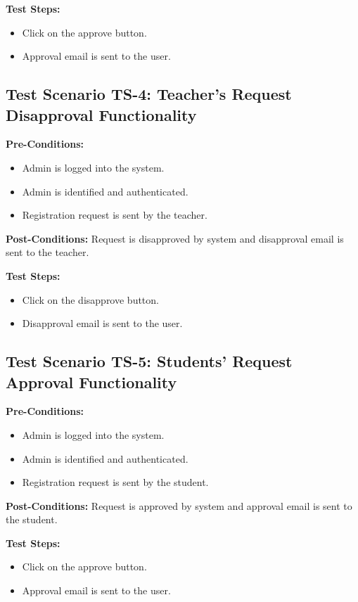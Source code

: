 \textbf{Test Steps:}
\begin{itemize}

\item Click on the approve button.
\item Approval email is sent to the user.

\end{itemize}


\subsection{Test Scenario TS-4: Teacher's Request Disapproval Functionality}
\textbf{Pre-Conditions: }
\begin{itemize}

\item Admin is logged into the system.
\item Admin is identified and authenticated.
\item Registration request is sent by the teacher.

\end{itemize}
\textbf{Post-Conditions: } Request is disapproved by system and disapproval email is sent to the teacher. 

\textbf{Test Steps:}
\begin{itemize}

\item Click on the disapprove button.
\item Disapproval email is sent to the user.

\end{itemize}

\subsection{Test Scenario TS-5: Students' Request Approval Functionality}
\textbf{Pre-Conditions: }
\begin{itemize}

\item Admin is logged into the system.
\item Admin is identified and authenticated.
\item Registration request is sent by the student.

\end{itemize}
\textbf{Post-Conditions: } Request is approved by system and approval email is sent to the student. 

\textbf{Test Steps:}
\begin{itemize}

\item Click on the approve button.
\item Approval email is sent to the user.

\end{itemize}

